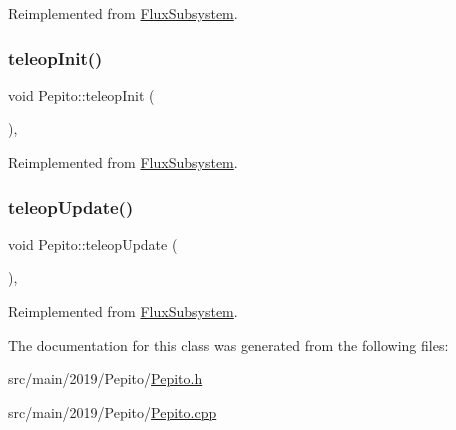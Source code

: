 Reimplemented from \hyperlink{classFluxSubsystem_ac2b1c08b53251870e945edf7080c1549}{Flux\+Subsystem}.

\mbox{\label{classPepito_a5001bee2d7dcc225c87ac36d5eddc452}} 
\subsubsection{\texorpdfstring{teleop\+Init()}{teleopInit()}}
{\footnotesize\ttfamily void Pepito\+::teleop\+Init (\begin{DoxyParamCaption}{ }\end{DoxyParamCaption})\hspace{0.3cm}{\ttfamily [override]}, {\ttfamily [virtual]}}



Reimplemented from \hyperlink{classFluxSubsystem_aec6d05e4f80c3783684598fb92ad2e55}{Flux\+Subsystem}.

\mbox{\label{classPepito_ac19e921b35d2d76cb5b6a2105b26f568}} 
\subsubsection{\texorpdfstring{teleop\+Update()}{teleopUpdate()}}
{\footnotesize\ttfamily void Pepito\+::teleop\+Update (\begin{DoxyParamCaption}{ }\end{DoxyParamCaption})\hspace{0.3cm}{\ttfamily [override]}, {\ttfamily [virtual]}}



Reimplemented from \hyperlink{classFluxSubsystem_a327d76affc60699bfa62563e364e42f5}{Flux\+Subsystem}.



The documentation for this class was generated from the following files\+:\begin{DoxyCompactItemize}
\item 
src/main/2019/\+Pepito/\hyperlink{Pepito_8h}{Pepito.\+h}\item 
src/main/2019/\+Pepito/\hyperlink{Pepito_8cpp}{Pepito.\+cpp}\end{DoxyCompactItemize}
